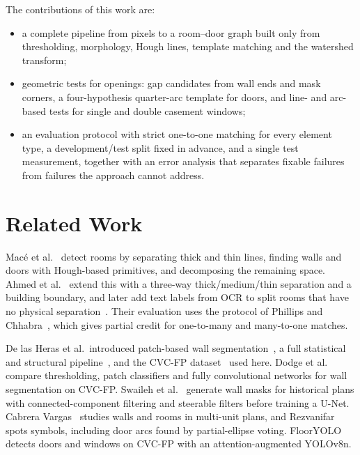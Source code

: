 \documentclass[conference]{IEEEtran}
\begin{document}
The contributions of this work are:
\begin{itemize}
\item a complete pipeline from pixels to a room--door graph built only from
thresholding, morphology, Hough lines, template matching and the watershed
transform;
\item geometric tests for openings: gap candidates from wall ends and mask
corners, a four-hypothesis quarter-arc template for doors, and line- and
arc-based tests for single and double casement windows;
\item an evaluation protocol with strict one-to-one matching for every
element type, a development/test split fixed in advance, and a single test
measurement, together with an error analysis that separates fixable
failures from failures the approach cannot address.
\end{itemize}

\section{Related Work}

Mac\'e et al.~\cite{mace2010rooms} detect rooms by separating thick and thin
lines, finding walls and doors with Hough-based primitives, and decomposing
the remaining space. Ahmed et al.~\cite{ahmed2011improved} extend this with a
three-way thick/medium/thin separation and a building boundary, and later add
text labels from OCR to split rooms that have no physical
separation~\cite{ahmed2012rooms}. Their evaluation uses the protocol of
Phillips and Chhabra~\cite{phillips1999evaluation}, which gives partial
credit for one-to-many and many-to-one matches.

De las Heras et al.\ introduced patch-based wall
segmentation~\cite{delasheras2011patch}, a full statistical and structural
pipeline~\cite{delasheras2014statistical}, and the CVC-FP
dataset~\cite{delasheras2015cvcfp} used here. Dodge et
al.~\cite{dodge2017parsing} compare thresholding, patch classifiers and fully
convolutional networks for wall segmentation on CVC-FP. Swaileh et
al.~\cite{swaileh2021versailles} generate wall masks for historical plans
with connected-component filtering and steerable filters before training a
U-Net. Cabrera Vargas~\cite{cabrera2018walls} studies walls and rooms in
multi-unit plans, and Rezvanifar~\cite{rezvanifar2021symbols} spots symbols,
including door arcs found by partial-ellipse voting. FloorYOLO~\cite{santhosh2026flooryolo}
detects doors and windows on CVC-FP with an attention-augmented YOLOv8n.
\end{document}

